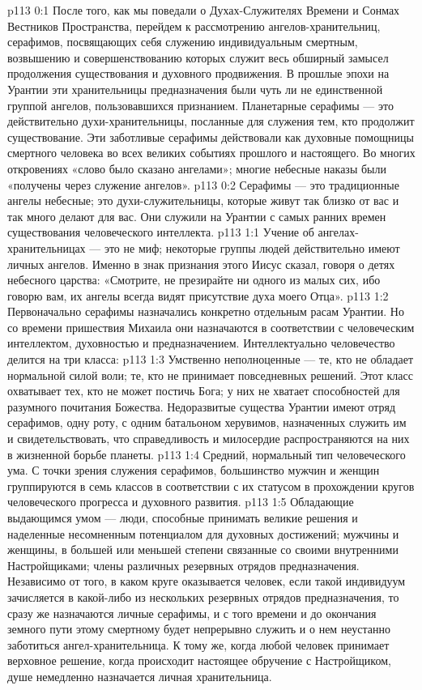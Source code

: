 \author{Глава Серафимов}
\vs p113 0:1 После того, как мы поведали о Духах\hyp{}Служителях Времени и Сонмах Вестников Пространства, перейдем к рассмотрению ангелов\hyp{}хранительниц, серафимов, посвящающих себя служению индивидуальным смертным, возвышению и совершенствованию которых служит весь обширный замысел продолжения существования и духовного продвижения. В прошлые эпохи на Урантии эти хранительницы предназначения были чуть ли не единственной группой ангелов, пользовавшихся признанием. Планетарные серафимы --- это действительно духи\hyp{}хранительницы, посланные для служения тем, кто продолжит существование. Эти заботливые серафимы действовали как духовные помощницы смертного человека во всех великих событиях прошлого и настоящего. Во многих откровениях «слово было сказано ангелами»; многие небесные наказы были «получены через служение ангелов».
\vs p113 0:2 Серафимы --- это традиционные ангелы небесные; это духи\hyp{}служительницы, которые живут так близко от вас и так много делают для вас. Они служили на Урантии с самых ранних времен существования человеческого интеллекта.
\vs p113 1:1 Учение об ангелах\hyp{}хранительницах --- это не миф; некоторые группы людей действительно имеют личных ангелов. Именно в знак признания этого Иисус сказал, говоря о детях небесного царства: «Смотрите, не презирайте ни одного из малых сих, ибо говорю вам, их ангелы всегда видят присутствие духа моего Отца».
\vs p113 1:2 Первоначально серафимы назначались конкретно отдельным расам Урантии. Но со времени пришествия Михаила они назначаются в соответствии с человеческим интеллектом, духовностью и предназначением. Интеллектуально человечество делится на три класса:
\vs p113 1:3 \bibnobreakspace Умственно неполноценные --- те, кто не обладает нормальной силой воли; те, кто не принимает повседневных решений. Этот класс охватывает тех, кто не может постичь Бога; у них не хватает способностей для разумного почитания Божества. Недоразвитые существа Урантии имеют отряд серафимов, одну роту, с одним батальоном херувимов, назначенных служить им и свидетельствовать, что справедливость и милосердие распространяются на них в жизненной борьбе планеты.
\vs p113 1:4 \pc {}\bibnobreakspace Средний, нормальный тип человеческого ума. С точки зрения служения серафимов, большинство мужчин и женщин группируются в семь классов в соответствии с их статусом в прохождении кругов человеческого прогресса и духовного развития.
\vs p113 1:5 \pc {}\bibnobreakspace Обладающие выдающимся умом --- люди, способные принимать великие решения и наделенные несомненным потенциалом для духовных достижений; мужчины и женщины, в большей или меньшей степени связанные со своими внутренними Настройщиками; члены различных резервных отрядов предназначения. Независимо от того, в каком круге оказывается человек, если такой индивидуум зачисляется в какой\hyp{}либо из нескольких резервных отрядов предназначения, то сразу же назначаются личные серафимы, и с того времени и до окончания земного пути этому смертному будет непрерывно служить и о нем неустанно заботиться ангел\hyp{}хранительница. К тому же, когда любой человек принимает  верховное решение, когда происходит настоящее обручение с Настройщиком, душе немедленно назначается личная хранительница.
